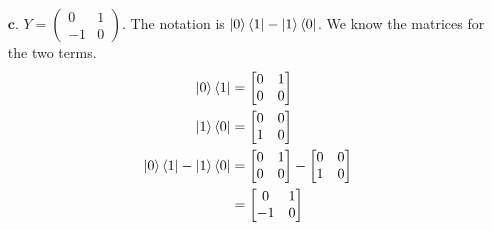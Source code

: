 \documentclass[11pt]{article}
\begin{document}
\begin{enumerate}
    \item[$\textbf{c.}$]
    $Y = \begin{pmatrix}0 & 1 \\ -1 & 0 \end{pmatrix}$.
        The notation is $\ket{0}\bra{1} - \ket{1}\bra{0}$. 
        We know the matrices for the two terms.
        \begin{align*}
            \ket{0}\bra{1} &= \begin{bmatrix}
            0 & 1 \\
            0 & 0 
        \end{bmatrix} \\
            \ket{1}\bra{0} &= \begin{bmatrix}
            0 & 0 \\
            1 & 0 
        \end{bmatrix} \\
            \ket{0}\bra{1} - \ket{1}\bra{0}
            &= \begin{bmatrix}
            0 & 1 \\
            0 & 0 
        \end{bmatrix} -
        \begin{bmatrix}
            0 & 0 \\
            1 & 0 
        \end{bmatrix} \\
            &= 
        \begin{bmatrix}
            0 & 1 \\
            -1 & 0 
        \end{bmatrix}
        \end{align*}


\end{enumerate}
\end{document}
